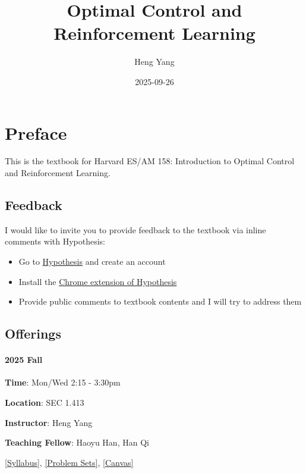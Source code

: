 \documentclass[
]{book}
\title{Optimal Control and Reinforcement Learning}
\author{Heng Yang}
\date{2025-09-26}
\theoremstyle{definition}
\theoremstyle{definition}
\theoremstyle{definition}
\theoremstyle{definition}
\theoremstyle{remark}
\begin{document}
\maketitle

{
\setcounter{tocdepth}{1}
\tableofcontents
}
\chapter*{Preface}\label{preface}

This is the textbook for Harvard ES/AM 158: Introduction to Optimal Control and Reinforcement Learning.

\section*{Feedback}\label{feedback}

I would like to invite you to provide feedback to the textbook via inline comments with Hypothesis:

\begin{itemize}
\item
  Go to \href{https://hypothes.is}{Hypothesis} and create an account
\item
  Install the \href{https://chrome.google.com/webstore/detail/hypothesis-web-pdf-annota/bjfhmglciegochdpefhhlphglcehbmek}{Chrome extension of Hypothesis}
\item
  Provide public comments to textbook contents and I will try to address them
\end{itemize}

\section*{Offerings}\label{offerings}

\subsubsection*{2025 Fall}\label{fall}

\textbf{Time}: Mon/Wed 2:15 - 3:30pm

\textbf{Location}: SEC 1.413

\textbf{Instructor}: Heng Yang

\textbf{Teaching Fellow}: Haoyu Han, Han Qi

\href{https://docs.google.com/document/d/1dIRYQZZJDx8K2q1TrodDDLg-bKJWWmj7o7yzOGlIs7o/edit?usp=sharing}{{[}Syllabus{]}}, \href{https://github.com/ComputationalRobotics/2025-ES-AM-158-PSET}{{[}Problem Sets{]}}, \href{https://canvas.harvard.edu/courses/153422}{{[}Canvas{]}}
\end{document}
